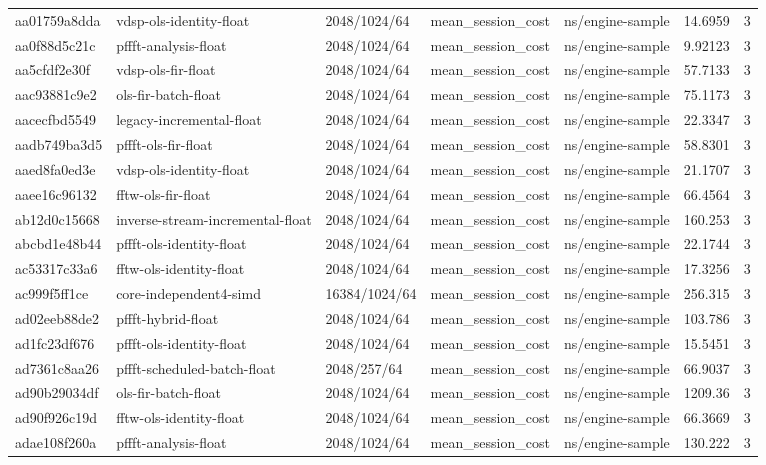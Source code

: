 \begin{longtable}{lllllrr}
aa01759a8dda & vdsp-ols-identity-float & 2048/1024/64 & mean\_session\_cost & ns/engine-sample & 14.6959 & 3 \\
aa0f88d5c21c & pffft-analysis-float & 2048/1024/64 & mean\_session\_cost & ns/engine-sample & 9.92123 & 3 \\
aa5cfdf2e30f & vdsp-ols-fir-float & 2048/1024/64 & mean\_session\_cost & ns/engine-sample & 57.7133 & 3 \\
aac93881c9e2 & ols-fir-batch-float & 2048/1024/64 & mean\_session\_cost & ns/engine-sample & 75.1173 & 3 \\
aacecfbd5549 & legacy-incremental-float & 2048/1024/64 & mean\_session\_cost & ns/engine-sample & 22.3347 & 3 \\
aadb749ba3d5 & pffft-ols-fir-float & 2048/1024/64 & mean\_session\_cost & ns/engine-sample & 58.8301 & 3 \\
aaed8fa0ed3e & vdsp-ols-identity-float & 2048/1024/64 & mean\_session\_cost & ns/engine-sample & 21.1707 & 3 \\
aaee16c96132 & fftw-ols-fir-float & 2048/1024/64 & mean\_session\_cost & ns/engine-sample & 66.4564 & 3 \\
ab12d0c15668 & inverse-stream-incremental-float & 2048/1024/64 & mean\_session\_cost & ns/engine-sample & 160.253 & 3 \\
abcbd1e48b44 & pffft-ols-identity-float & 2048/1024/64 & mean\_session\_cost & ns/engine-sample & 22.1744 & 3 \\
ac53317c33a6 & fftw-ols-identity-float & 2048/1024/64 & mean\_session\_cost & ns/engine-sample & 17.3256 & 3 \\
ac999f5ff1ce & core-independent4-simd & 16384/1024/64 & mean\_session\_cost & ns/engine-sample & 256.315 & 3 \\
ad02eeb88de2 & pffft-hybrid-float & 2048/1024/64 & mean\_session\_cost & ns/engine-sample & 103.786 & 3 \\
ad1fc23df676 & pffft-ols-identity-float & 2048/1024/64 & mean\_session\_cost & ns/engine-sample & 15.5451 & 3 \\
ad7361c8aa26 & pffft-scheduled-batch-float & 2048/257/64 & mean\_session\_cost & ns/engine-sample & 66.9037 & 3 \\
ad90b29034df & ols-fir-batch-float & 2048/1024/64 & mean\_session\_cost & ns/engine-sample & 1209.36 & 3 \\
ad90f926c19d & fftw-ols-identity-float & 2048/1024/64 & mean\_session\_cost & ns/engine-sample & 66.3669 & 3 \\
adae108f260a & pffft-analysis-float & 2048/1024/64 & mean\_session\_cost & ns/engine-sample & 130.222 & 3 \\

\end{longtable}
